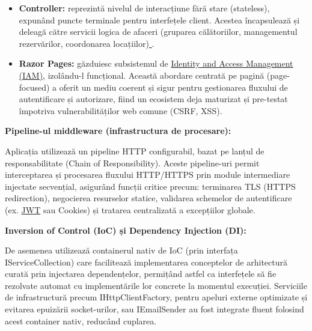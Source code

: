 \begin{itemize}
    \item \textbf{Controller:} reprezintă nivelul de interacțiune fără stare (stateless), expunând puncte terminale pentru interfețele client. Acestea încapsulează și deleagă către servicii logica de afaceri (gruparea călătoriilor, managementul rezervărilor, coordonarea locațiilor)\href{https://learn.microsoft.com/en-us/aspnet/core/mvc/controllers/actions?view=aspnetcore-10.0}{ }\cite{controller_ref}.
    \item \textbf{Razor Pages:} găzduiesc subsistemul de \href{https://www.microsoft.com/en-us/security/business/security-101/what-is-identity-access-management-iam}{Identity and Access Management (IAM)}\cite{iam_ref}, izolându-l funcțional. Această abordare centrată pe pagină (page-focused) a oferit un mediu coerent și sigur pentru gestionarea fluxului de autentificare și autorizare, fiind un ecosistem deja maturizat și pre-testat împotriva vulnerabilităților web comune (CSRF, XSS)\href{https://learn.microsoft.com/en-us/aspnet/core/razor-pages/security/authorization/simple?view=aspnetcore-10.0&utm_source=chatgpt.com}{}\cite{razor_ref}.

\end{itemize}


\textbf{Pipeline-ul middleware (infrastructura de procesare):}

Aplicația utilizează un pipeline HTTP configurabil, bazat pe lanțul de responsabilitate (Chain of Responsibility). Aceste pipeline-uri permit interceptarea și procesarea fluxului HTTP/HTTPS prin module intermediare injectate secvențial, asigurând funcții critice precum: terminarea TLS (HTTPS redirection), negocierea resurselor statice, validarea schemelor de autentificare (ex. \href{https://www.jwt.io/introduction#what-is-json-web-token}{JWT}\cite{jwt_ref} sau Cookies) și tratarea centralizată a excepțiilor globale.

\textbf{Inversion of Control (IoC) și Dependency Injection (DI):}

De asemenea utilizează containerul nativ de IoC (prin interfața IServiceCollection) care facilitează implementarea conceptelor de arhitectură curată prin injectarea dependențelor, permițând astfel ca interfețele să fie rezolvate automat cu implementările lor concrete la momentul execuției. Serviciile de infrastructură precum IHttpClientFactory, pentru apeluri externe optimizate și evitarea epuizării socket-urilor, sau IEmailSender au fost integrate fluent folosind acest container nativ, reducând cuplarea\href{https://learn.microsoft.com/en-us/aspnet/core/fundamentals/dependency-injection?view=aspnetcore-10.0&utm_source=chatgpt.com}{}\cite{dependency_ref}.

